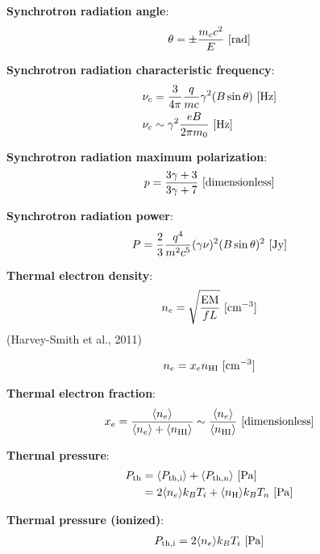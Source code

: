 \documentclass[a4paper,10pt]{article}
\begin{document}
{\noindent}\textbf{Synchrotron radiation angle}:
\begin{align*}
\theta = \pm \frac{m_cc^2}{E} ~ [\rm rad]
\end{align*}

{\noindent}\textbf{Synchrotron radiation characteristic frequency}:
\begin{align*}
\nu_c &= \dfrac{3}{4\pi}\dfrac{q}{mc}\gamma^2(B\sin\theta)~[{\rm Hz}] \\
\nu_c &\sim \gamma^2 \frac{eB}{2\pi m_0} ~ [{\rm Hz}]
\end{align*}

{\noindent}\textbf{Synchrotron radiation maximum polarization}:
\begin{align*}
p = \frac{3\gamma + 3}{3\gamma+7} ~ [{\rm dimensionless}]
\end{align*}

{\noindent}\textbf{Synchrotron radiation power}:
\begin{align*}
P = \frac{2}{3}\dfrac{q^4}{m^2c^5}(\gamma\nu)^2(B\sin\theta)^2 ~ [{\rm Jy}]
\end{align*}

{\noindent}\textbf{Thermal electron density}:
\begin{align*}
    n_e = \sqrt{\frac{{\rm EM}}{fL}} ~ [{\rm cm^{-3}}]
\end{align*}
(Harvey-Smith et al., 2011)

\begin{align*}
    n_e = x_en_{\rm HI} ~ [{\rm cm^{-3}}]
\end{align*}

{\noindent}\textbf{Thermal electron fraction}:
\begin{align*}
    x_e = \frac{\langle n_e\rangle}{\langle n_e\rangle + \langle n_{\rm HI}\rangle} \sim \frac{\langle n_e\rangle}{\langle n_{\rm HI}\rangle} ~ [{\rm dimensionless}]
\end{align*}

{\noindent}\textbf{Thermal pressure}:
\begin{align*}
    P_{\rm th} &= \langle P_{\rm th,i} \rangle + \langle P_{\rm th,n} \rangle ~ [{\rm Pa}] \\
                     &= 2\langle n_e\rangle k_BT_i + \langle n_{\rm H}\rangle k_BT_n ~ [{\rm Pa}]
\end{align*}

{\noindent}\textbf{Thermal pressure (ionized)}:
\begin{align*}
    P_{\rm th,i} = 2\langle n_e\rangle k_BT_i ~ [{\rm Pa}]
\end{align*}
\end{document}
